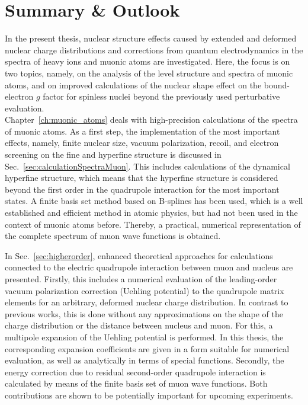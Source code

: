 \chapter*{Summary \& Outlook}
\label{ch:conclusion}

In the present thesis, nuclear structure effects caused by extended and deformed nuclear charge distributions and corrections from quantum electrodynamics in the spectra of heavy ions and muonic atoms are investigated. 
Here, the focus is on two topics, namely, on the analysis of the level structure and spectra of muonic atoms, and on improved calculations of the nuclear shape effect on the bound-electron $g$ factor for spinless nuclei beyond the previously used perturbative evaluation.\\[11pt]%
%
Chapter~\ref{ch:muonic_atoms} deals with high-precision calculations of the spectra of muonic atoms. 
As a first step, the implementation of the most important effects, namely, finite nuclear size, vacuum polarization, recoil, and electron screening on the fine and hyperfine structure is discussed in Sec.~\ref{sec:calculationSpectraMuon}.
This includes calculations of the dynamical hyperfine structure, which means that the hyperfine structure is considered beyond the first order in the quadrupole interaction for the most important states.
A finite basis set method based on B-splines has been used, which is a well established and efficient method in atomic physics, but had not been used in the context of muonic atoms before. Thereby, a practical, numerical representation of the complete spectrum of muon wave functions is obtained.

In Sec.~\ref{sec:higherorder}, enhanced theoretical approaches for calculations connected to the electric quadrupole interaction between muon and nucleus are presented. 
Firstly, this includes a numerical evaluation of the leading-order vacuum polarization correction (Uehling potential) to the quadrupole matrix elements for an arbitrary, deformed nuclear charge distribution. In contrast to previous works, this is done without any approximations on the shape of the charge distribution or the distance between nucleus and muon. For this, a multipole expansion of the Uehling potential is performed. In this thesis, the corresponding expansion coefficients are given in a form suitable for numerical evaluation, as well as analytically in terms of special functions.
Secondly, the energy correction due to residual second-order quadrupole interaction is calculated by means of the finite basis set of muon wave functions.
Both contributions are shown to be potentially important for upcoming experiments.

